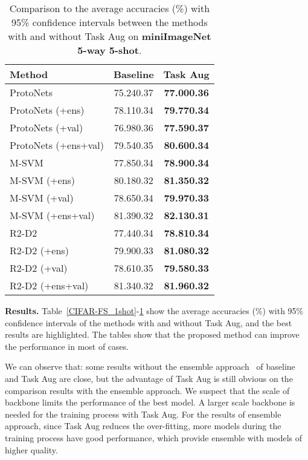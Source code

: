 \documentclass[10pt,twocolumn,letterpaper]{article}
\begin{document}
\begin{table}[t]
\caption{Comparison to the average accuracies (\%) with 95\% confidence intervals between the methods with and without Task Aug on \textbf{miniImageNet 5-way 5-shot}.}
\label{miniImageNet_5shot}
\begin{center}
\begin{tabular}{lcc}
\toprule[1pt]
\textbf{Method} & Baseline & Task Aug \\
\hline
ProtoNets~\cite{snell2017prototypical} & 75.240.37 & \textbf{77.000.36}\\
ProtoNets (+ens) & 78.110.34 & \textbf{79.770.34}\\
ProtoNets (+val) & 76.980.36 & \textbf{77.590.37}\\
ProtoNets (+ens+val) & 79.540.35 & \textbf{80.600.34}\\
\hline
M-SVM~\cite{lee2019meta} & 77.850.34 & \textbf{78.900.34}\\
M-SVM (+ens) & 80.180.32 & \textbf{81.350.32}\\
M-SVM (+val) & 78.650.34 & \textbf{79.970.33}\\
M-SVM (+ens+val) & 81.390.32 & \textbf{82.130.31}\\
\hline
R2-D2~\cite{bertinetto2018meta} & 77.440.34 & \textbf{78.810.34}\\
R2-D2 (+ens) & 79.900.33 & \textbf{81.080.32}\\
R2-D2 (+val) & 78.610.35 & \textbf{79.580.33}\\
R2-D2 (+ens+val) & 81.340.32 & \textbf{81.960.32}\\
\bottomrule[1pt]
\end{tabular}
\end{center}
\end{table}

\textbf{Results.} Table~\ref{CIFAR-FS_1shot}-\ref{miniImageNet_5shot} show the average accuracies (\%) with 95\% confidence intervals of the methods with and without Task Aug, and the best results are highlighted. The tables show that the proposed method can improve the performance in most of cases.

We can observe that: some results without the ensemble approach~\cite{huang2017snapshot} of baseline and Task Aug are close, but the advantage of Task Aug is still obvious on the comparison results with the ensemble approach. We suspect that the scale of backbone limits the performance of the best model. A larger scale backbone is needed for the training process with Task Aug. For the results of ensemble approach, since Task Aug reduces the over-fitting, more models during the training process have good performance, which provide ensemble with models of higher quality.
\end{document}
